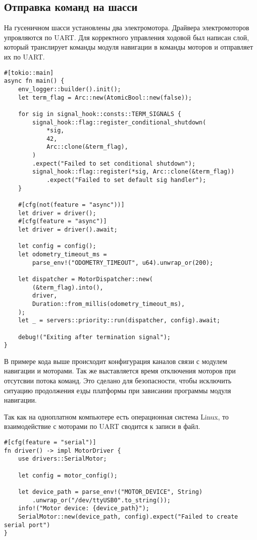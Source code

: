 \subsection{Отправка команд на шасси}
На гусеничном шасси установлены два электромотора. Драйвера электромоторов упровляются по UART. Для корректного управления ходовой был написан слой, который транслирует команды модуля навигации в команды моторов и отправляет их по UART.

\begin{lstlisting}
#[tokio::main]
async fn main() {
    env_logger::builder().init();
    let term_flag = Arc::new(AtomicBool::new(false));

    for sig in signal_hook::consts::TERM_SIGNALS {
        signal_hook::flag::register_conditional_shutdown(
            *sig,
            42,
            Arc::clone(&term_flag),
        )
        .expect("Failed to set conditional shutdown");
        signal_hook::flag::register(*sig, Arc::clone(&term_flag))
            .expect("Failed to set default sig handler");
    }

    #[cfg(not(feature = "async"))]
    let driver = driver();
    #[cfg(feature = "async")]
    let driver = driver().await;

    let config = config();
    let odometry_timeout_ms =
        parse_env!("ODOMETRY_TIMEOUT", u64).unwrap_or(200);

    let dispatcher = MotorDispatcher::new(
        (&term_flag).into(),
        driver,
        Duration::from_millis(odometry_timeout_ms),
    );
    let _ = servers::priority::run(dispatcher, config).await;

    debug!("Exiting after termination signal");
}
\end{lstlisting}

В примере кода выше происходит конфигурация каналов связи с модулем навигации и моторами. 
Так же выставляется время отключения моторов при отсутсвии потока команд. Это сделано для безопасности, чтобы исключить ситуацию продолжения езды платформы при зависании программы модуля навигации.

Так как на одноплатном компьютере есть операционная система Linux, то взаимодействие с моторами по UART сводится к записи в файл.

\begin{lstlisting}
#[cfg(feature = "serial")]
fn driver() -> impl MotorDriver {
    use drivers::SerialMotor;

    let config = motor_config();

    let device_path = parse_env!("MOTOR_DEVICE", String)
        .unwrap_or("/dev/ttyUSB0".to_string());
    info!("Motor device: {device_path}");
    SerialMotor::new(device_path, config).expect("Failed to create serial port")
}
\end{lstlisting}


